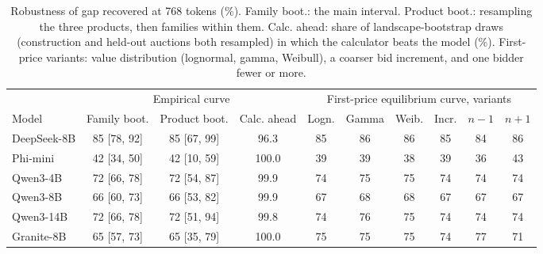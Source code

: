 \begin{table}[t]
\caption{Robustness of gap recovered at 768 tokens (\%). Family boot.: the main interval. Product boot.: resampling the three products, then families within them. Calc. ahead: share of landscape-bootstrap draws (construction and held-out auctions both resampled) in which the calculator beats the model (\%). First-price variants: value distribution (lognormal, gamma, Weibull), a coarser bid increment, and one bidder fewer or more.}
\label{tab:robust}
\footnotesize
\centering

\begin{tabular}{lccc cccccc}
\toprule
& \multicolumn{3}{c}{Empirical curve} & \multicolumn{6}{c}{First-price equilibrium curve, variants} \\ \cmidrule(lr){2-4}\cmidrule(lr){5-10} Model & Family boot. & Product boot. & Calc. ahead & Logn. & Gamma & Weib. & Incr. & $n-1$ & $n+1$ \\
\midrule
DeepSeek-8B & 85 [78, 92] & 85 [67, 99] & 96.3 & 85 & 86 & 86 & 85 & 84 & 86 \\
Phi-mini & 42 [34, 50] & 42 [10, 59] & 100.0 & 39 & 39 & 38 & 39 & 36 & 43 \\
Qwen3-4B & 72 [66, 78] & 72 [54, 87] & 99.9 & 74 & 75 & 75 & 74 & 74 & 74 \\
Qwen3-8B & 66 [60, 73] & 66 [53, 82] & 99.9 & 67 & 68 & 68 & 67 & 67 & 67 \\
Qwen3-14B & 72 [66, 78] & 72 [51, 94] & 99.8 & 74 & 76 & 75 & 74 & 74 & 74 \\
Granite-8B & 65 [57, 73] & 65 [35, 79] & 100.0 & 75 & 75 & 75 & 74 & 77 & 71 \\
\bottomrule
\end{tabular}
\end{table}
